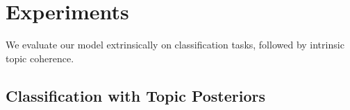 \section{Experiments}
\label{sec:exp}

We evaluate our model extrinsically on classification tasks,
followed by intrinsic topic coherence.

\subsection{Classification with Topic Posteriors}
\label{subsec:exp_class}

